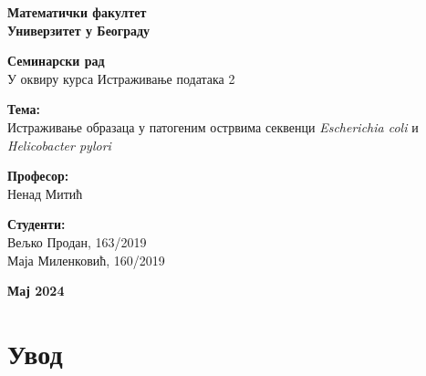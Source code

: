 \documentclass[12pt]{article}
\begin{document}
 


\begin{center}
    \large\textbf{Математички факултет} \\
    \large\textbf{Универзитет у Београду}
    
    \vspace{3cm}
    
    \Large\textbf{Семинарски рад} \\
    \large У оквиру курса Истраживање података 2
    
    \vspace{3cm}
    
    \LARGE\textbf{Тема:} \\
    \Large Истраживање образаца у патогеним острвима секвенци \textit{Escherichia coli} и \textit{Helicobacter pylori}
    
    \vspace{4cm}
    
    \begin{minipage}{0.4\textwidth}
        \begin{flushleft}
            \large\textbf{Професор:} \\
            \large Ненад Митић
        \end{flushleft}
    \end{minipage}
    \begin{minipage}{0.4\textwidth}
        \begin{flushright}
            \large\textbf{Студенти:} \\
            \large Вељко Продан, 163/2019 \\
            \large Маја Миленковић, 160/2019
        \end{flushright}
    \end{minipage}

    \vfill
    
    \large\textbf{Мај 2024}
    
\end{center}

\newpage

\tableofcontents

\addto{}

\newpage

\section{Увод}
\end{document}
